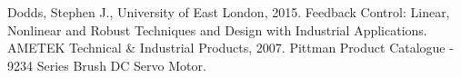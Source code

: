 \begin{thebibliography}{11} %
		Dodds, Stephen J., University of East London, 2015. Feedback Control: Linear, Nonlinear and Robust Techniques and Design with Industrial Applications.
		AMETEK Technical \& Industrial Products, 2007. Pittman Product Catalogue - 9234 Series Brush DC Servo Motor.
\end{thebibliography}